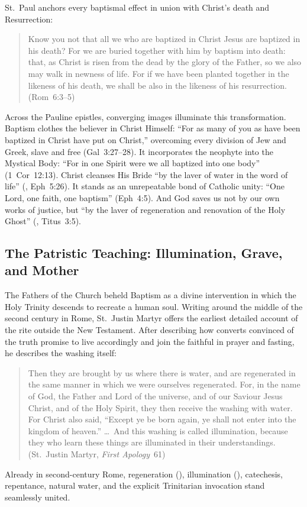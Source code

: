 St.~Paul anchors every baptismal effect in union with Christ's death and Resurrection:
\begin{quotation}
Know you not that all we who are baptized in Christ Jesus are baptized in his death? For we are buried together with him by baptism into death: that, as Christ is risen from the dead by the glory of the Father, so we also may walk in newness of life. For if we have been planted together in the likeness of his death, we shall be also in the likeness of his resurrection. (Rom~6:3--5)
\end{quotation}
Across the Pauline epistles, converging images illuminate this transformation. Baptism clothes the believer in Christ Himself: ``For as many of you as have been baptized in Christ have put on Christ,'' overcoming every division of Jew and Greek, slave and free (Gal~3:27--28). It incorporates the neophyte into the Mystical Body: ``For in one Spirit were we all baptized into one body'' (1~Cor~12:13). Christ cleanses His Bride ``by the laver of water in the word of life'' (, Eph~5:26). It stands as an unrepeatable bond of Catholic unity: ``One Lord, one faith, one baptism'' (Eph~4:5). And God saves us not by our own works of justice, but ``by the laver of regeneration and renovation of the Holy Ghost'' (, Titus~3:5).

\subsection{The Patristic Teaching: Illumination, Grave, and Mother}
\label{subsec:baptism-fathers}

The Fathers of the Church beheld Baptism as a divine intervention in which the Holy Trinity descends to recreate a human soul. Writing around the middle of the second century in Rome, St.~Justin Martyr offers the earliest detailed account of the rite outside the New Testament. After describing how converts convinced of the truth promise to live accordingly and join the faithful in prayer and fasting, he describes the washing itself:
\begin{quotation}
Then they are brought by us where there is water, and are regenerated in the same manner in which we were ourselves regenerated. For, in the name of God, the Father and Lord of the universe, and of our Saviour Jesus Christ, and of the Holy Spirit, they then receive the washing with water. For Christ also said, ``Except ye be born again, ye shall not enter into the kingdom of heaven.'' \dots\ And this washing is called illumination, because they who learn these things are illuminated in their understandings. (St.~Justin Martyr, \emph{First Apology}~61)
\end{quotation}
Already in second-century Rome, regeneration (), illumination (), catechesis, repentance, natural water, and the explicit Trinitarian invocation stand seamlessly united.

